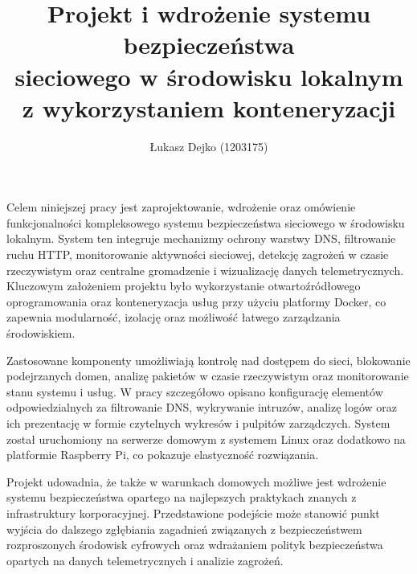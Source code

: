 \documentclass[
    left=2.5cm,         %
    right=2.5cm,        %
    top=2.5cm,          %
    bottom=3cm,         %
    bindingoffset=6mm,  %
    nohyphenation=true %
]{eiti/eiti-thesis} %
\begin{document}
\EngineerThesis
{}

\title{
    Projekt i wdrożenie systemu bezpieczeństwa \\ 
    sieciowego w środowisku lokalnym \\
    z wykorzystaniem konteneryzacji \\
}


\author{Łukasz Dejko (1203175)}


\date{\the\year}
\maketitle

\streszczenie Celem niniejszej pracy jest zaprojektowanie, wdrożenie oraz omówienie funkcjonalności kompleksowego systemu bezpieczeństwa sieciowego w środowisku lokalnym. System ten integruje mechanizmy ochrony warstwy DNS, filtrowanie ruchu HTTP, monitorowanie aktywności sieciowej, detekcję zagrożeń w czasie rzeczywistym oraz centralne gromadzenie i wizualizację danych telemetrycznych. Kluczowym założeniem projektu było wykorzystanie otwartoźródłowego oprogramowania oraz konteneryzacja usług przy użyciu platformy Docker, co zapewnia modularność, izolację oraz możliwość łatwego zarządzania środowiskiem.

Zastosowane komponenty umożliwiają kontrolę nad dostępem do sieci, blokowanie podejrzanych domen, analizę pakietów w czasie rzeczywistym oraz monitorowanie stanu systemu i usług. W pracy szczegółowo opisano konfigurację elementów odpowiedzialnych za filtrowanie DNS, wykrywanie intruzów, analizę logów oraz ich prezentację 
w formie czytelnych wykresów i pulpitów zarządczych. System został uruchomiony na serwerze domowym z systemem Linux oraz dodatkowo na platformie Raspberry Pi, 
co pokazuje elastyczność rozwiązania.

Projekt udowadnia, że także w warunkach domowych możliwe jest wdrożenie systemu bezpieczeństwa opartego na najlepszych praktykach znanych z infrastruktury korporacyjnej. Przedstawione podejście może stanowić punkt wyjścia do dalszego zgłębiania zagadnień związanych z bezpieczeństwem rozproszonych środowisk cyfrowych oraz wdrażaniem polityk bezpieczeństwa opartych na danych telemetrycznych i analizie zagrożeń.
\end{document}
